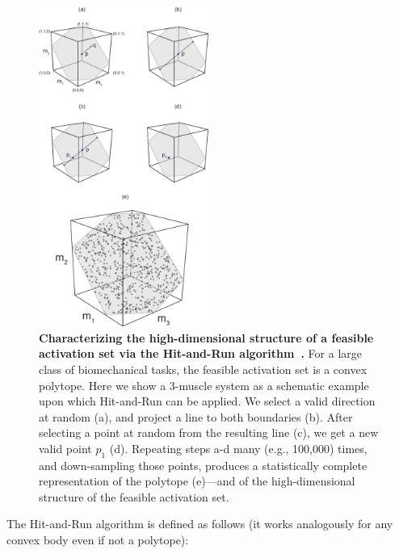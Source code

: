 \documentclass[letterpaper]{article}
\begin{document}
\begin{figure}[htbp]
\centering
\includegraphics[width=0.5\textwidth]{numbered_figures/figure_2_hit_and_run_ALL_steps.pdf}
\caption{\textbf{Characterizing the high-dimensional structure of a feasible activation set via the Hit-and-Run algorithm~\cite{lovasz1999hit}.}  For a large class of biomechanical tasks, the feasible activation set is a convex polytope. Here we show a 3-muscle system as a schematic example upon which Hit-and-Run can be applied. We select a valid direction at random (a), and project a line to both boundaries (b). After selecting a point at random from the resulting line (c), we get a new valid point $p_1$ (d). Repeating steps a-d many (e.g., 100,000) times, and down-sampling those points, produces a statistically complete representation of the polytope (e)---and of the high-dimensional structure of the feasible activation set.}
\label{fig:figure_2_hit_and_run_steps}
\end{figure}
The Hit-and-Run algorithm is defined as follows (it works analogously for any convex body even if not a polytope)\cite{lovasz1999hit}:
\end{document}
